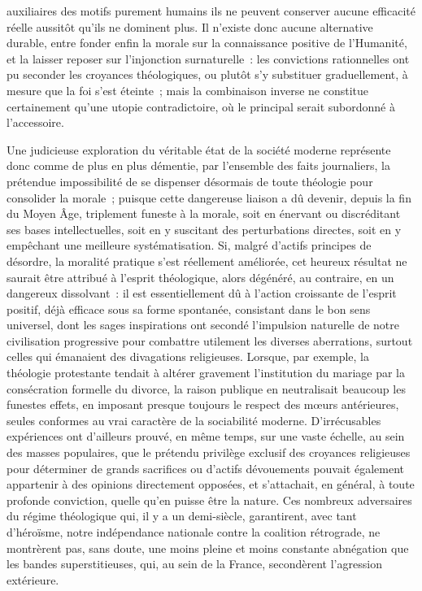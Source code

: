 \documentclass[french,twoside]{book} %
\begin{document}
auxiliaires des motifs purement humains ils ne peuvent conserver aucune efficacité réelle aussitôt qu’ils ne dominent plus. Il n’existe donc aucune alternative durable, entre fonder enfin la morale sur la connaissance positive de l’Humanité, et la laisser reposer sur l’injonction surnaturelle : les convictions rationnelles ont pu seconder les croyances théologiques, ou plutôt s’y substituer graduellement, à mesure que la foi s’est éteinte ; mais la combinaison inverse ne constitue certainement qu’une utopie contradictoire, où le principal serait subordonné à l’accessoire.\par
Une judicieuse exploration du véritable état de la société moderne représente donc comme de plus en plus démentie, par l’ensemble des faits journaliers, la prétendue impossibilité de se dispenser désormais de toute théologie pour consolider la morale ; puisque cette dangereuse liaison a dû devenir, depuis la fin du Moyen Âge, triplement funeste à la morale, soit en énervant ou discréditant ses bases intellectuelles, soit en y suscitant des perturbations directes, soit en y empêchant une meilleure systématisation. Si, malgré d’actifs principes de désordre, la moralité pratique s’est réellement améliorée, cet heureux résultat ne saurait être attribué à l’esprit théologique, alors dégénéré, au contraire, en un dangereux dissolvant : il est essentiellement dû à l’action croissante de l’esprit positif, déjà efficace sous sa forme spontanée, consistant dans le bon sens universel, dont les sages inspirations ont secondé l’impulsion naturelle de notre civilisation progressive pour combattre utilement les diverses aberrations, surtout celles qui émanaient des divagations religieuses. Lorsque, par exemple, la théologie protestante tendait à altérer gravement l’institution du mariage par la consécration formelle du divorce, la raison publique en neutralisait beaucoup les funestes effets, en imposant presque toujours le respect des mœurs antérieures, seules conformes au vrai caractère de la sociabilité moderne. D’irrécusables expériences ont d’ailleurs prouvé, en même temps, sur une vaste échelle, au sein des masses populaires, que le prétendu privilège exclusif des croyances religieuses pour déterminer de grands sacrifices ou d’actifs dévouements pouvait également appartenir à des opinions directement opposées, et s’attachait, en général, à toute profonde conviction, quelle qu’en puisse être la nature. Ces nombreux adversaires du régime théologique qui, il y a un demi-siècle, garantirent, avec tant d’héroïsme, notre indépendance nationale contre la coalition rétrograde, ne montrèrent pas, sans doute, une moins pleine et moins constante abnégation que les bandes superstitieuses, qui, au sein de la France, secondèrent l’agression extérieure.\par
\end{document}
